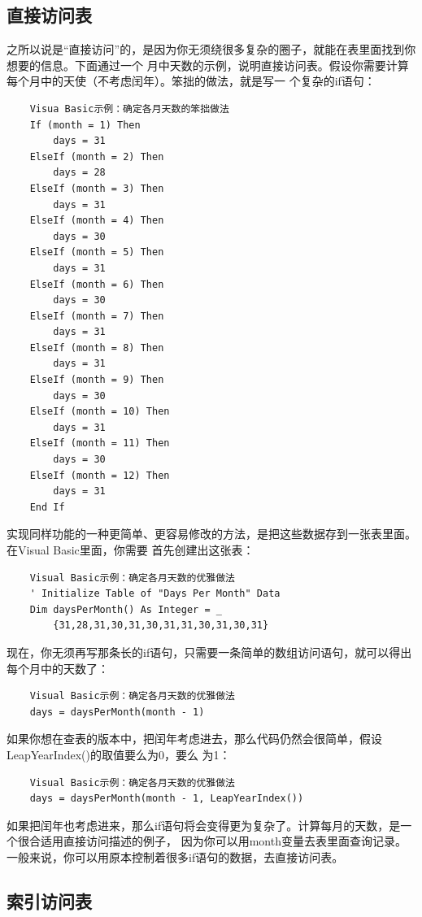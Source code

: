 \documentclass{article}
\begin{document}
\subsection{直接访问表}
之所以说是“直接访问”的，是因为你无须绕很多复杂的圈子，就能在表里面找到你想要的信息。下面通过一个
月中天数的示例，说明直接访问表。假设你需要计算每个月中的天使（不考虑闰年）。笨拙的做法，就是写一
个复杂的if语句：
\begin{lstlisting}
    Visua Basic示例：确定各月天数的笨拙做法
    If (month = 1) Then
        days = 31
    ElseIf (month = 2) Then
        days = 28
    ElseIf (month = 3) Then
        days = 31
    ElseIf (month = 4) Then
        days = 30
    ElseIf (month = 5) Then
        days = 31
    ElseIf (month = 6) Then
        days = 30
    ElseIf (month = 7) Then
        days = 31
    ElseIf (month = 8) Then
        days = 31
    ElseIf (month = 9) Then
        days = 30
    ElseIf (month = 10) Then
        days = 31
    ElseIf (month = 11) Then
        days = 30
    ElseIf (month = 12) Then
        days = 31
    End If
\end{lstlisting}
实现同样功能的一种更简单、更容易修改的方法，是把这些数据存到一张表里面。在Visual Basic里面，你需要
首先创建出这张表：
\begin{lstlisting}
    Visual Basic示例：确定各月天数的优雅做法
    ' Initialize Table of "Days Per Month" Data
    Dim daysPerMonth() As Integer = _
        {31,28,31,30,31,30,31,31,30,31,30,31}
\end{lstlisting}
现在，你无须再写那条长的if语句，只需要一条简单的数组访问语句，就可以得出每个月中的天数了：
\begin{lstlisting}
    Visual Basic示例：确定各月天数的优雅做法
    days = daysPerMonth(month - 1)
\end{lstlisting}
如果你想在查表的版本中，把闰年考虑进去，那么代码仍然会很简单，假设LeapYearIndex()的取值要么为0，要么
为1：
\begin{lstlisting}
    Visual Basic示例：确定各月天数的优雅做法
    days = daysPerMonth(month - 1, LeapYearIndex())
\end{lstlisting}
如果把闰年也考虑进来，那么if语句将会变得更为复杂了。计算每月的天数，是一个很合适用直接访问描述的例子，
因为你可以用month变量去表里面查询记录。一般来说，你可以用原本控制着很多if语句的数据，去直接访问表。

\subsection{索引访问表}
\end{document}
